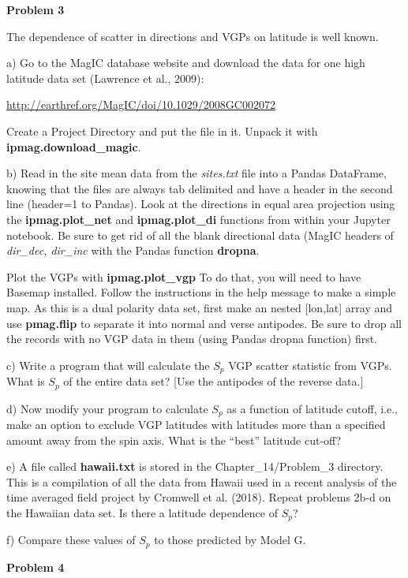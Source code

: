 {{\bf Problem 3}

The dependence of scatter in directions and VGPs on latitude is well known. 

a) Go to the MagIC database website and download the data for one high latitude data set (Lawrence et al., 2009):  \nocite{lawrence08}

{ \url{http://earthref.org/MagIC/doi/10.1029/2008GC002072}	}

Create a Project Directory and put the file in it.  Unpack it with {\bf  ipmag.download\_magic}.  

b)  Read in the site mean data from the {\it sites.txt} file into a Pandas DataFrame, knowing that the files are always tab delimited and have a header in the second line (header=1 to Pandas).  Look at the directions in equal area projection using the {\bf ipmag.plot\_net} and {\bf ipmag.plot\_di} functions  from within your Jupyter notebook.   Be sure to get rid of all the blank directional data (MagIC headers of {\it dir\_dec, dir\_inc} with the Pandas function {\bf dropna}. 

Plot the VGPs with {\bf ipmag.plot\_vgp}  To do that, you will need to have Basemap installed.  Follow the instructions in the help message to  make a simple map.     As this is a dual polarity data set, first make an nested [lon,lat] array and use {\bf pmag.flip} to separate it into normal and verse antipodes.   Be sure to drop all the records with no VGP data in them (using Pandas dropna function) first.    

c)  Write a program that will calculate the $S_p$ VGP scatter statistic from VGPs.   What is $S_p$ of the entire data set?  [Use the antipodes of the reverse data.]  

d)  Now modify your program to calculate $S_p$ as a function of  latitude cutoff, i.e., make an option to exclude VGP latitudes with latitudes more than a specified amount away from the spin axis.    What is the ``best'' latitude cut-off?  

e) A file called {\bf hawaii.txt} is stored in the Chapter\_14/Problem\_3  directory.  This is a compilation of all the data from Hawaii used in a recent analysis of the time averaged field project by Cromwell et al. (2018). \nocite{cromwell18}
Repeat problems 2b-d on the Hawaiian data set.  Is there a latitude dependence of $S_p$? 


f) Compare these values of $S_p$  to those predicted by Model G. 



{\bf Problem 4}

}
